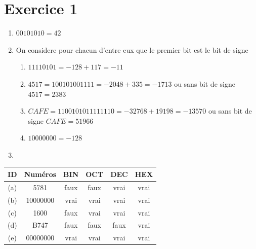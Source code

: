 \documentclass{article}
\begin{document}
\section*{Exercice 1}
\begin{enumerate}
	\item $00101010 = 42$
	\item On considere pour chacun d'entre eux que le premier bit est le bit de signe
	      \begin{enumerate}[label=\alph*)]
	      	\item $11110101 = -128+117 = -11$
	      	\item $4517 = 100101001111 =-2048+335 =-1713 $ ou sans bit de signe $4517 = 2383 $
	      	\item $CAFE = 1100101011111110 = -32768 +19198 = -13570$ ou sans bit de signe $CAFE = 51966$
	      	\item $10000000 = -128 $
	      \end{enumerate}
	\item
\end{enumerate}
\begin{minipage}{\linewidth}
	\centering
	\begin{tabular}{c | c | c | c | c | c }
		ID  & Num\'eros & BIN  & OCT  & DEC  & HEX  \\ \hline
		(a) & 5781      & faux & faux & vrai & vrai \\ \hline
		(b) & 10000000  & vrai & vrai & vrai & vrai \\ \hline
		(c) & 1600      & faux & vrai & vrai & vrai \\ \hline
		(d) & B747      & faux & faux & faux & vrai \\ \hline
		(e) & 00000000  & vrai & vrai & vrai & vrai \\
	\end{tabular}
\end{minipage}
\end{document}
